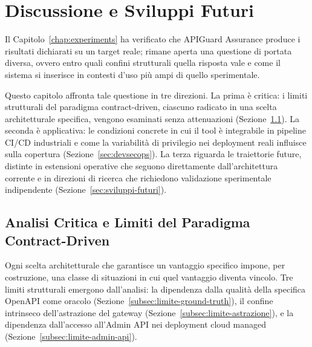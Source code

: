 

\chapter{Discussione e Sviluppi Futuri}\label{chap:discussion}

Il Capitolo~\ref{chap:experiments} ha verificato che APIGuard Assurance produce i risultati dichiarati su un target reale; rimane aperta una questione di portata diversa, ovvero entro quali confini strutturali quella risposta vale e come il sistema si inserisce in contesti d'uso più ampi di quello sperimentale.

Questo capitolo affronta tale questione in tre direzioni. La prima è critica: i limiti strutturali del paradigma contract-driven, ciascuno radicato in una scelta architetturale specifica, vengono esaminati senza attenuazioni (Sezione~\ref{sec:limiti}). La seconda è applicativa: le condizioni concrete in cui il tool è integrabile in pipeline \gls{CI/CD} industriali e come la variabilità di privilegio nei deployment reali influisce sulla copertura (Sezione~\ref{sec:devsecops}). La terza riguarda le traiettorie future, distinte in estensioni operative che seguono direttamente dall'architettura corrente e in direzioni di ricerca che richiedono validazione sperimentale indipendente (Sezione~\ref{sec:sviluppi-futuri}).


\section{Analisi Critica e Limiti del Paradigma Contract-Driven}%
\label{sec:limiti}

Ogni scelta architetturale che garantisce un vantaggio specifico impone, per costruzione, una classe di situazioni in cui quel vantaggio diventa vincolo. Tre limiti strutturali emergono dall'analisi: la dipendenza dalla qualità della specifica OpenAPI come oracolo (Sezione~\ref{subsec:limite-ground-truth}), il confine intrinseco dell'astrazione del gateway (Sezione~\ref{subsec:limite-astrazione}), e la dipendenza dall'accesso all'Admin API nei deployment cloud managed (Sezione~\ref{subsec:limite-admin-api}).

